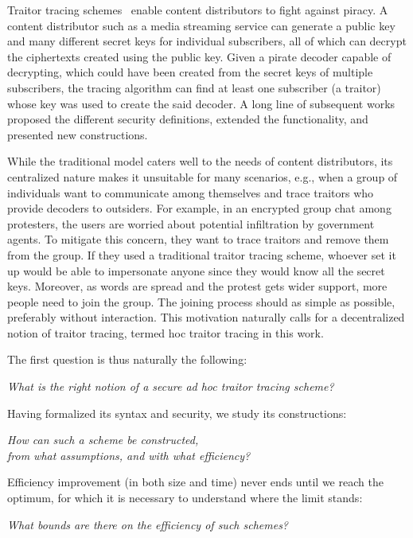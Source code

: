 Traitor tracing schemes~\cite{C:ChoFiaNao94} enable content distributors to fight against piracy.
A content distributor such as a media streaming service can generate a public key and many different secret keys for individual subscribers,
all of which can decrypt the ciphertexts created using the public key.
Given a pirate decoder capable of decrypting,
which could have been created from the secret keys of multiple subscribers,
the tracing algorithm can find at least one subscriber (a traitor) whose key was used to create the said decoder.
A long line of subsequent works~\cite{EC:BonSahWat06,CCS:BonWat06,CCS:BonNao08,C:BonZha14,EC:NisWicZha16,STOC:GoyKopWat18,C:GKRW18,TCC:CVWWW18,C:GQWW19,TCC:GoyKopWat19,C:Zhandry20,C:Zhandry21,EC:GonLuoWee23} proposed the different security definitions, extended the functionality, and presented new constructions.

While the traditional model caters well to the needs of content distributors,
its centralized nature makes it unsuitable for many scenarios,
e.g., when a group of individuals want to communicate among themselves and
trace traitors who provide decoders to outsiders.
For example,
in an encrypted group chat among protesters,
the users are worried about potential infiltration by government agents.
To mitigate this concern,
they want to trace traitors and remove them from the group.
If they used a traditional traitor tracing scheme,
whoever set it up would be able to impersonate anyone
since they would know all the secret keys.
Moreover, as words are spread and the protest gets wider support,
more people need to join the group.
The joining process should as simple as possible,
preferably without interaction.
This motivation naturally calls for a decentralized notion of traitor tracing, termed \ad hoc traitor tracing in this work.

The first question is thus naturally the following:
\begin{center}
\itshape
What is the right notion of a secure ad hoc traitor tracing scheme?\\
\end{center}
Having formalized its syntax and security,
we study its constructions:
\begin{center}
\itshape
How can such a scheme be constructed,\\
from what assumptions, and with what efficiency?
\end{center}
Efficiency improvement (in both size and time)
never ends until we reach the optimum,
for which it is necessary to understand where the limit stands:
\begin{center}
\itshape
What bounds are there on the efficiency of such schemes?
\end{center}
